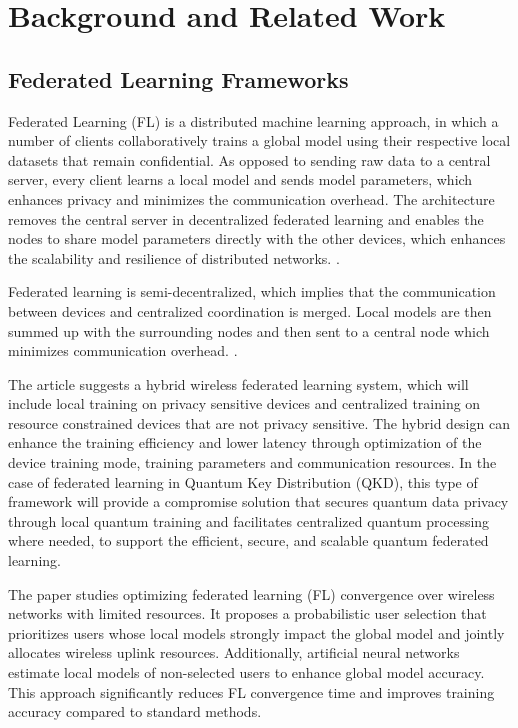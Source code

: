 \documentclass[conference]{IEEEtran}
\begin{document}
\section{Background and Related Work}

\subsection{Federated Learning Frameworks}

Federated Learning (FL) is a distributed machine learning approach, in which a number of clients collaboratively trains a global model using their respective local datasets that remain confidential. As opposed to sending raw data to a central server, every client learns a local model and sends model parameters, which enhances privacy and minimizes the communication overhead. The architecture removes the central server in decentralized federated learning and enables the nodes to share model parameters directly with the other devices, which enhances the scalability and resilience of distributed networks. \cite{b8}.


Federated learning is semi-decentralized, which implies that the communication between devices and centralized coordination is merged. Local models are then summed up with the surrounding nodes and then sent to a central node which minimizes communication overhead. \cite{b9}.

The article suggests a hybrid wireless federated learning system, which will include local training on privacy sensitive devices and centralized training on resource constrained devices that are not privacy sensitive. The hybrid design can enhance the training efficiency and lower latency through optimization of the device training mode, training parameters and communication resources. In the case of federated learning in Quantum Key Distribution (QKD), this type of framework will provide a compromise solution that secures quantum data privacy through local quantum training and facilitates centralized quantum processing where needed, to support the efficient, secure, and scalable quantum federated learning.  \cite{b11}

The paper studies optimizing federated learning (FL) convergence over wireless networks with limited resources. It proposes a probabilistic user selection that prioritizes users whose local models strongly impact the global model and jointly allocates wireless uplink resources. Additionally, artificial neural networks estimate local models of non-selected users to enhance global model accuracy. This approach significantly reduces FL convergence time and improves training accuracy compared to standard methods. \cite{b12}
\end{document}
